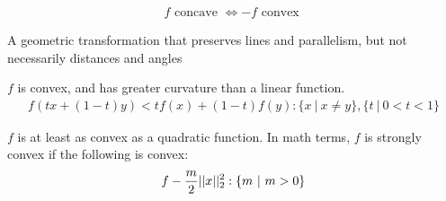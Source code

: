 \documentclass{article}
\begin{document}
\begin{fact}
  \begin{align}
    f\text{ concave }\Longleftrightarrow -f\text{ convex }
  \end{align}
\end{fact}
\begin{definition}
  A geometric transformation that preserves lines and parallelism, but not
  necessarily distances and angles
\end{definition}

\begin{definition}
  $f$ is convex, and has greater curvature than a linear function.
  \begin{align}
    f(tx+(1-t)y)<tf(x)+(1-t)f(y):\{x~|~x\neq y\},\{t~|~0<t<1\}
  \end{align}
\end{definition}
\begin{definition}
  $f$ is at least as convex as a quadratic function.  In math terms, $f$ is
  strongly convex if the following is convex:
  \begin{align}
    f-{m\over 2}||x||^2_2:\{m~|~m>0\}
  \end{align}
\end{definition}
\end{document}

